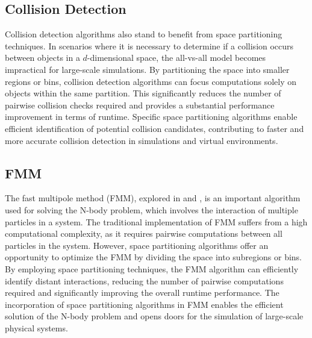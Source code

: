 \documentclass{juliacon}
\begin{document}
\subsection{Collision Detection}
Collision detection algorithms also stand to benefit from space
partitioning techniques. In scenarios where it is necessary to determine if a
collision occurs between objects in a $d$-dimensional space, the all-vs-all
model becomes impractical for large-scale simulations. By partitioning the
space into smaller regions or bins, collision detection algorithms can focus
computations solely on objects within the same partition. This significantly
reduces the number of pairwise collision checks required and provides a
substantial performance improvement in terms of runtime. Specific space
partitioning algorithms enable efficient identification of potential collision
candidates, contributing to faster and more accurate collision detection in
simulations and virtual environments.

\subsection{FMM}

The fast multipole method (FMM), explored in \cite{FMM} and \cite{AMM}, is an
important algorithm used for solving the N-body problem, which involves the
interaction of multiple particles in a system. The traditional implementation
of FMM suffers from a high computational complexity, as it requires pairwise
computations between all particles in the system. However, space partitioning
algorithms offer an opportunity to optimize the FMM by dividing the space into
subregions or bins. By employing space partitioning techniques, the FMM
algorithm can efficiently identify distant interactions, reducing the number of
pairwise computations required and significantly improving the overall runtime
performance. The incorporation of space partitioning algorithms in FMM enables
the efficient solution of the N-body problem and opens doors for the simulation
of large-scale physical systems.
\end{document}

